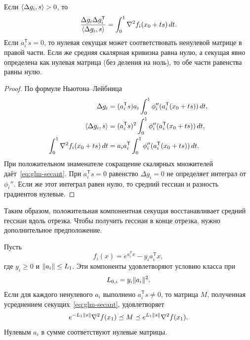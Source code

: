 \begin{proposition}\label{prop:glm-secant}
Если $\langle \Delta g_i,s\rangle>0$, то
\begin{equation}\label{eq:glm-secant}
 \frac{\Delta g_i\Delta g_i^{\mathsf T}}{\langle \Delta g_i,s\rangle}
 =\int_0^1\nabla^2f_i(x_0+ts)\,dt.
\end{equation}
Если $a_i^{\mathsf T}s=0$, то нулевая секущая может соответствовать
ненулевой матрице в правой части. Если же средняя скалярная кривизна
равна нулю, а секущая явно определена как нулевая матрица (без деления
на ноль), то обе части равенства равны нулю.
\end{proposition}

\begin{proof}
По формуле Ньютона--Лейбница
\[
 \begin{aligned}
 \Delta g_i&=(a_i^{\mathsf T}s)a_i
     \int_0^1\phi_i''(a_i^{\mathsf T}(x_0+ts))\,dt,\\
 \langle \Delta g_i,s\rangle&=(a_i^{\mathsf T}s)^2
     \int_0^1\phi_i''(a_i^{\mathsf T}(x_0+ts))\,dt,\\
 \int_0^1\nabla^2f_i(x_0+ts)\,dt
 &=a_i a_i^{\mathsf T}\int_0^1\phi_i''(a_i^{\mathsf T}(x_0+ts))\,dt.
 \end{aligned}
\]
При положительном знаменателе сокращение скалярных множителей
даёт~\eqref{eq:glm-secant}. При $a_i^{\mathsf T}s=0$
равенство $\Delta g_i=0$ не определяет интеграл от $\phi_i''$.
Если же этот интеграл равен нулю, то средний гессиан и разность градиентов нулевые.
\end{proof}

Таким образом, положительная компонентная секущая восстанавливает
средний гессиан вдоль отрезка. Чтобы получить гессиан в конце отрезка,
нужно дополнительное предположение.

\begin{proposition}\label{prop:poisson-secants}
Пусть
\[
 f_i(x)=e^{a_i^{\mathsf T}x}-y_i a_i^{\mathsf T}x,
\]
где $y_i\ge0$ и $\lVert a_i\rVert\le L_1$.
Эти компоненты удовлетворяют условию класса при
\[
 L_{0,i}=y_i\lVert a_i\rVert^2.
\]
Если для каждого ненулевого $a_i$ выполнено $a_i^{\mathsf T}s\ne0$,
то матрица $M$, полученная усреднением секущих~\eqref{eq:glm-secant},
удовлетворяет
\begin{equation}\label{eq:poisson-secant-comparison}
 e^{-L_1\lVert s\rVert}\nabla^2f(x_1)
 \preceq M\preceq e^{L_1\lVert s\rVert}\nabla^2f(x_1).
\end{equation}
Нулевым $a_i$ в сумме соответствуют нулевые матрицы.
\end{proposition}

